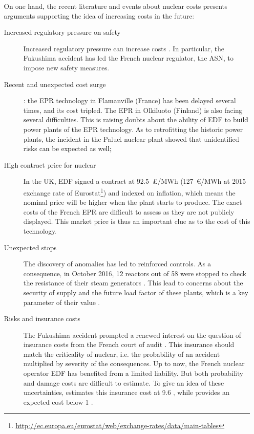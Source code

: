 On one hand, the recent literature and events about nuclear costs presents arguments supporting the idea of increasing costs in the future:
\begin{description}
	
	\item [Increased regulatory pressure on safety] Increased regulatory pressure can increase costs \citep{Cooper2011}. In particular, the Fukushima accident has led the French nuclear regulator, the ASN, to impose new safety measures.
	
	\item [Recent and unexpected cost surge]: the EPR technology in Flamanville (France) has been delayed several times, and its cost tripled.
	The EPR in Olkiluoto (Finland) is also facing several difficulties.
	This is raising doubts about the ability of EDF to build power plants of the EPR technology.
	As to retrofitting the historic power plants, the incident in the Paluel nuclear plant showed that unidentified risks can be expected as well;
	
	\item [High contract price for nuclear] In the UK, EDF signed a contract at 92.5~\pounds/MWh (127~\euro/MWh at 2015 exchange rate of Eurostat\footnote{\url{http://ec.europa.eu/eurostat/web/exchange-rates/data/main-tables}}) and indexed on inflation, which means the nominal price will be higher when the plant starts to produce. The exact costs of the French EPR are difficult to assess as they are not publicly displayed. This market price is thus an important clue as to the cost of this technology.
	
	\item [Unexpected stops] The discovery of anomalies has led to reinforced controls. As a consequence, in October 2016, 12 reactors out of 58 were stopped to check the resistance of their steam generators \citep{Monicault2016}. This lead to concerns about the security of supply and the future load factor of these plants, which is a key parameter of their value \citep{IEA2015}.
	
	\item [Risks and insurance costs] The Fukushima accident prompted a renewed interest on the question of insurance costs from the French court of audit \citep{CourdesComptes2012}. This insurance should match the criticality of nuclear, i.e. the probability of an accident multiplied by severity of the consequences. Up to now, the French nuclear operator EDF has benefited from a limited liability. But both probability and damage costs are difficult to estimate. To give an idea of these uncertainties, \citet{Boccard2014} estimates this insurance cost at 9.6 \emwh, while \citet{Leveque2015} provides an expected cost below 1 \emwh. 
	

\end{description}

